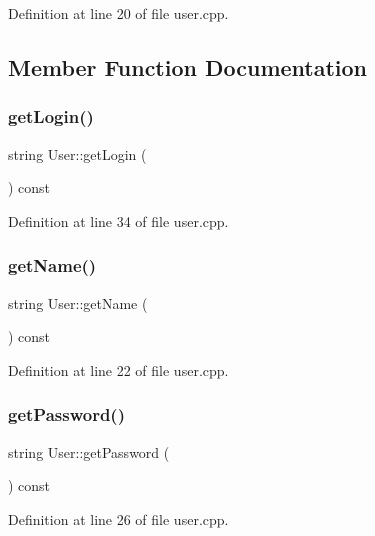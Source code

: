 Definition at line 20 of file user.\+cpp.



\subsection{Member Function Documentation}
\mbox{\label{class_user_a696573ea58ab847ec562b3ff55f5532b}} 
\subsubsection{\texorpdfstring{get\+Login()}{getLogin()}}
{\footnotesize\ttfamily string User\+::get\+Login (\begin{DoxyParamCaption}{ }\end{DoxyParamCaption}) const}



Definition at line 34 of file user.\+cpp.

\mbox{\label{class_user_ab9b2b5feb6bdd1582696eb6d44cee384}} 
\subsubsection{\texorpdfstring{get\+Name()}{getName()}}
{\footnotesize\ttfamily string User\+::get\+Name (\begin{DoxyParamCaption}{ }\end{DoxyParamCaption}) const}



Definition at line 22 of file user.\+cpp.

\mbox{\label{class_user_a33429bdd1253091697a9c5c5e1448bee}} 
\subsubsection{\texorpdfstring{get\+Password()}{getPassword()}}
{\footnotesize\ttfamily string User\+::get\+Password (\begin{DoxyParamCaption}{ }\end{DoxyParamCaption}) const}



Definition at line 26 of file user.\+cpp.

